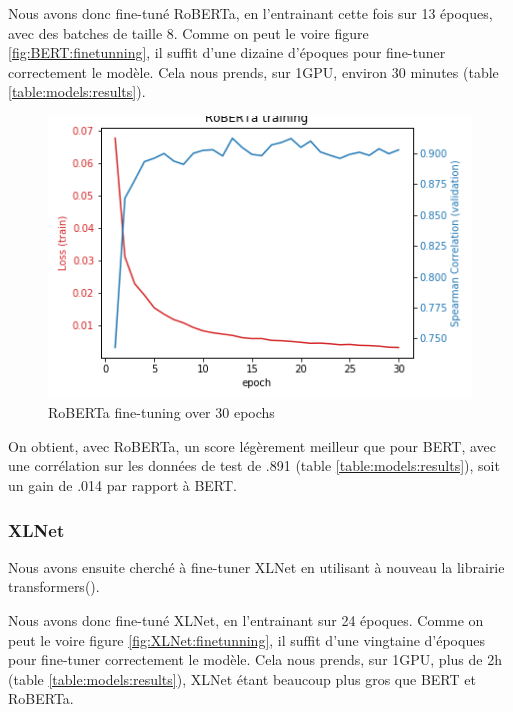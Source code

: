 \documentclass[11pt,a4paper, french]{article}
\begin{document}
Nous avons donc fine-tuné RoBERTa, en l'entrainant cette fois sur 13 époques, avec des batches de taille 8. Comme on peut le voire figure \ref{fig:BERT:finetunning}, il suffit d'une dizaine d'époques pour fine-tuner correctement le modèle. Cela nous prends, sur 1GPU, environ 30 minutes (table \ref{table:models:results}).

\begin{figure}
  \includegraphics[width=\linewidth]{resources/RoBERTa-training.png}
  \caption{RoBERTa fine-tuning over 30 epochs}
  \label{fig:RoBERTa:finetunning}
\end{figure}

On obtient, avec RoBERTa, un score légèrement meilleur que pour BERT, avec une corrélation sur les données de test de .891 (table \ref{table:models:results}), soit un gain de .014 par rapport à BERT.

%
\subsubsection{XLNet}

Nous avons ensuite cherché à fine-tuner XLNet en utilisant à nouveau la librairie transformers(\cite{huggingface}).

Nous avons donc fine-tuné XLNet, en l'entrainant sur 24 époques. Comme on peut le voire figure \ref{fig:XLNet:finetunning}, il suffit d'une vingtaine d'époques pour fine-tuner correctement le modèle. Cela nous prends, sur 1GPU, plus de 2h (table \ref{table:models:results}), XLNet étant beaucoup plus gros que BERT et RoBERTa.
\end{document}

